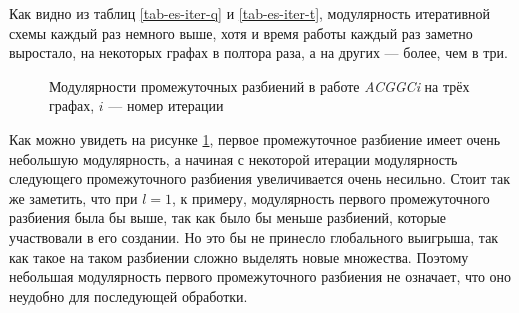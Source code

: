 Как видно из таблиц \ref{tab-es-iter-q} и \ref{tab-es-iter-t}, модулярность итеративной схемы каждый раз немного выше, хотя и время работы каждый раз заметно выростало, на некоторых графах в полтора раза, а на других --- более, чем в три.

\begin{figure}[H]
	\caption{Модулярности промежуточных разбиений в работе \emph{ACGGCi} на трёх графах, $i$ --- номер итерации}
	\label{fig:es-iter}
\end{figure}

Как можно увидеть на рисунке \ref{fig:es-iter}, первое промежуточное разбиение имеет очень небольшую модулярность, а начиная с некоторой итерации модулярность следующего промежуточного разбиения увеличивается очень несильно. Стоит так же заметить, что при $l = 1$, к примеру, модулярность первого промежуточного разбиения была бы выше, так как было бы меньше разбиений, которые участвовали в его создании. Но это бы не принесло глобального выигрыша, так как такое на таком разбиении сложно выделять новые множества. Поэтому небольшая модулярность первого промежуточного разбиения не означает, что оно неудобно для последующей обработки.

